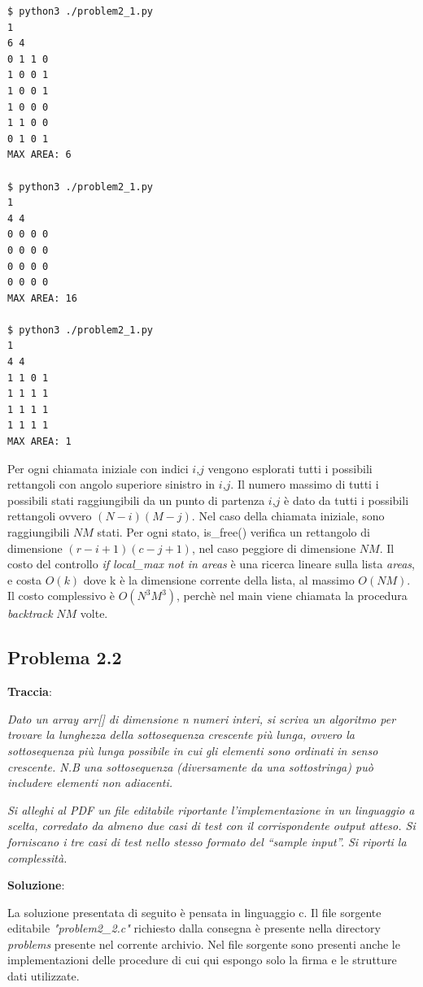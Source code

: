 \documentclass{article}
\begin{document}
\begin{commandline}
\begin{verbatim}
$ python3 ./problem2_1.py 
1
6 4 
0 1 1 0
1 0 0 1
1 0 0 1
1 0 0 0
1 1 0 0 
0 1 0 1
MAX AREA: 6

$ python3 ./problem2_1.py 
1
4 4 
0 0 0 0
0 0 0 0
0 0 0 0
0 0 0 0
MAX AREA: 16

$ python3 ./problem2_1.py 
1
4 4 
1 1 0 1 
1 1 1 1 
1 1 1 1 
1 1 1 1
MAX AREA: 1
\end{verbatim}
\end{commandline}

\noindent
Per ogni chiamata iniziale con indici $i$,$j$ vengono esplorati tutti i possibili rettangoli con angolo superiore sinistro in $i$,$j$. Il numero massimo di tutti i possibili stati raggiungibili da un punto di partenza $i$,$j$ è dato da tutti i possibili rettangoli ovvero $(N-i)(M-j)$. Nel caso della chiamata iniziale, sono raggiungibili $NM$ stati. Per ogni stato, is\_free() verifica un rettangolo di dimensione $(r-i+1)(c-j+1)$, nel caso peggiore di dimensione $NM$. Il costo del controllo \textit{if local\_max not in areas} è una ricerca lineare sulla lista \textit{areas}, e costa $O(k)$ dove k è la dimensione corrente della lista, al massimo $O(NM)$. Il costo complessivo è $O(N^3M^3)$, perchè nel main viene chiamata la procedura \textit{backtrack} $NM$ volte.

\subsection{Problema 2.2} \label{subsec:problema_2_2}
\textbf{Traccia}:

\noindent
\textit{Dato un array arr[] di dimensione n numeri interi, si scriva un algoritmo per trovare la lunghezza della sottosequenza crescente più lunga, ovvero la sottosequenza più lunga possibile in cui gli elementi sono ordinati in senso crescente. N.B una sottosequenza (diversamente da una sottostringa) può includere elementi non adiacenti.}

\noindent\textit{Si alleghi al PDF un file editabile riportante l'implementazione in un linguaggio a scelta, corredato da almeno due casi di test con il corrispondente output atteso. Si forniscano i tre casi di test nello stesso formato del “sample input”. Si riporti la complessità.}

\vspace{2\baselineskip}
\noindent
\textbf{Soluzione}: 

\noindent
La soluzione presentata di seguito è pensata in linguaggio c. Il file sorgente editabile \textit{"problem2\_2.c"} richiesto dalla consegna è presente nella directory \textit{problems} presente nel corrente archivio. Nel file sorgente sono presenti anche le implementazioni delle procedure di cui qui espongo solo la firma e le strutture dati utilizzate.
\end{document}
